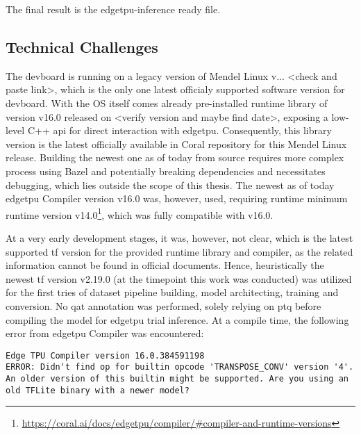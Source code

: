 {The final result is the \gls{edgetpu}-inference ready  file.

\subsection*{Technical Challenges}

The \gls{devboard} is running on a legacy version of Mendel Linux v...  <check and paste link>, which is the only one latest officialy supported software version for \gls{devboard}.
With the OS itself comes already pre-installed runtime library  of version v16.0 released on <verify version and maybe find date>, exposing a low-level C++ \gls{api}
for direct interaction with \gls{edgetpu}. Consequently, this library version is the latest officially available in Coral repository for this Mendel Linux release.
Building the newest one as of today from source requires more complex process using Bazel and potentially breaking dependencies and necessitates debugging,
which lies outside the scope of this thesis.
The newest as of today \gls{edgetpu} Compiler version v16.0 was, however, used,
requiring runtime minimum runtime version v14.0\footnote{\url{https://coral.ai/docs/edgetpu/compiler/\#compiler-and-runtime-versions}},
which was fully compatible with  v16.0.


At a very early development stages, it was, however, not clear, which is the latest supported \gls{tf} version for the provided runtime library and compiler,
as the related information cannot be found in official documents.
Hence, heuristically the newest \gls{tf} version v2.19.0 (at the timepoint this work was conducted) was utilized for the first tries of dataset pipeline building,
model architecting, training and conversion. No \gls{qat} annotation was performed, solely relying on \gls{ptq} before compiling the model for \gls{edgetpu} trial inference.
At a compile time, the following error from \gls{edgetpu} Compiler was encountered:

\begin{lstlisting}
Edge TPU Compiler version 16.0.384591198
ERROR: Didn't find op for builtin opcode 'TRANSPOSE_CONV' version '4'. An older version of this builtin might be supported. Are you using an old TFLite binary with a newer model?
\end{lstlisting}

}
